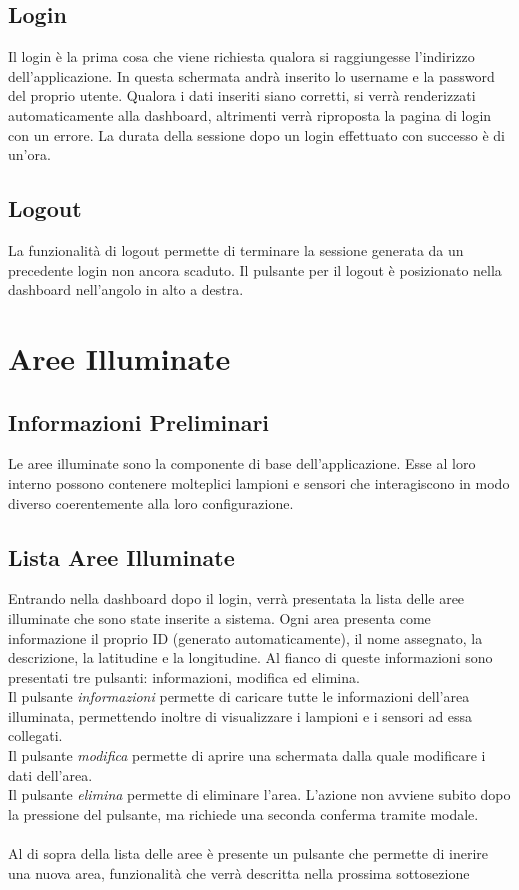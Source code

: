 \documentclass[a4paper, 12pt]{article}
\begin{document}
\subsection{Login}
Il login è la prima cosa che viene richiesta qualora si raggiungesse l'indirizzo dell'applicazione. In questa schermata andrà inserito lo username e la password del proprio utente. Qualora i dati inseriti siano corretti, si verrà renderizzati automaticamente alla dashboard, altrimenti verrà riproposta la pagina di login con un errore. La durata della sessione dopo un login effettuato con successo è di un'ora.

\subsection{Logout}
La funzionalità di logout permette di terminare la sessione generata da un precedente login non ancora scaduto. Il pulsante per il logout è posizionato nella dashboard nell'angolo in alto a destra.

\newpage
\section{Aree Illuminate}
\subsection{Informazioni Preliminari}
Le aree illuminate sono la componente di base dell'applicazione. Esse al loro interno possono contenere molteplici lampioni e sensori che interagiscono in modo diverso coerentemente alla loro configurazione.
\subsection{Lista Aree Illuminate}
Entrando nella dashboard dopo il login, verrà presentata la lista delle aree illuminate che sono state inserite a sistema. Ogni area presenta come informazione il proprio ID (generato automaticamente), il nome assegnato, la descrizione, la latitudine e la longitudine. Al fianco di queste informazioni sono presentati tre pulsanti: informazioni, modifica ed elimina. \\
Il pulsante \textit{informazioni} permette di caricare tutte le informazioni dell'area illuminata, permettendo inoltre di visualizzare i lampioni e i sensori ad essa collegati.\\
Il pulsante \textit{modifica} permette di aprire una schermata dalla quale modificare i dati dell'area.\\
Il pulsante \textit{elimina} permette di eliminare l'area. L'azione non avviene subito dopo la pressione del pulsante, ma richiede una seconda conferma tramite modale. \\
\\
Al di sopra della lista delle aree è presente un pulsante che permette di inerire una nuova area, funzionalità che verrà descritta nella prossima sottosezione
\end{document}
